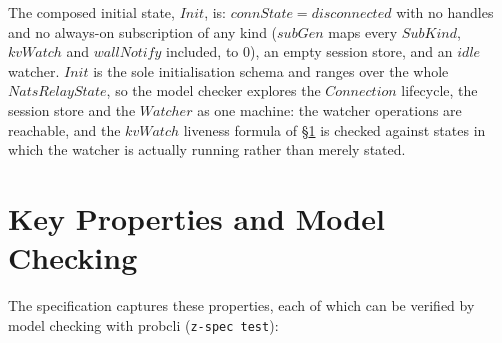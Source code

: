 \documentclass[a4paper,10pt,fleqn]{article}
\begin{document}
The composed initial state, $Init$, is: $connState = disconnected$ with no
handles and no always-on subscription of any kind ($subGen$ maps every
$SubKind$, $kvWatch$ and $wallNotify$ included, to $0$), an empty session store, and an
$idle$ watcher.  $Init$ is the sole initialisation schema and ranges over
the whole $NatsRelayState$, so the model checker explores the $Connection$
lifecycle, the session store and the $Watcher$ as one machine: the watcher
operations are reachable, and the $kvWatch$ liveness formula of
\S\ref{sec:modelcheck} is checked against states in which the watcher is
actually running rather than merely stated.

\section{Key Properties and Model Checking}
\label{sec:modelcheck}

The specification captures these properties, each of which can be
verified by model checking with probcli (\texttt{z-spec test}):
\end{document}
